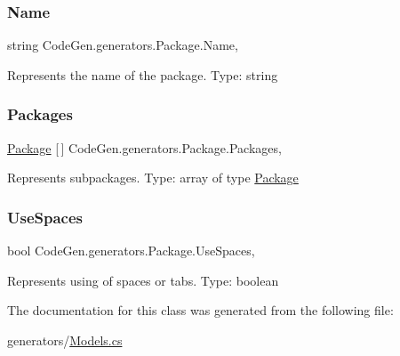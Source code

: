\subsubsection{\texorpdfstring{Name}{Name}}
{\footnotesize\ttfamily string Code\+Gen.\+generators.\+Package.\+Name\hspace{0.3cm}{\ttfamily [get]}, {\ttfamily [set]}}



Represents the name of the package. Type\+: string 

\mbox{\label{classCodeGen_1_1generators_1_1Package_a014a74cbc2bc2876e24d5a250cb54c68}} 
\subsubsection{\texorpdfstring{Packages}{Packages}}
{\footnotesize\ttfamily \mbox{\hyperlink{classCodeGen_1_1generators_1_1Package}{Package}} \mbox{[}$\,$\mbox{]} Code\+Gen.\+generators.\+Package.\+Packages\hspace{0.3cm}{\ttfamily [get]}, {\ttfamily [set]}}



Represents subpackages. Type\+: array of type \mbox{\hyperlink{classCodeGen_1_1generators_1_1Package}{Package}} 

\mbox{\label{classCodeGen_1_1generators_1_1Package_af03f90e7753d7fdc68699c32f86f82e9}} 
\subsubsection{\texorpdfstring{Use\+Spaces}{UseSpaces}}
{\footnotesize\ttfamily bool Code\+Gen.\+generators.\+Package.\+Use\+Spaces\hspace{0.3cm}{\ttfamily [get]}, {\ttfamily [set]}}



Represents using of spaces or tabs. Type\+: boolean 



The documentation for this class was generated from the following file\+:\begin{DoxyCompactItemize}
\item 
generators/\mbox{\hyperlink{Models_8cs}{Models.\+cs}}\end{DoxyCompactItemize}
